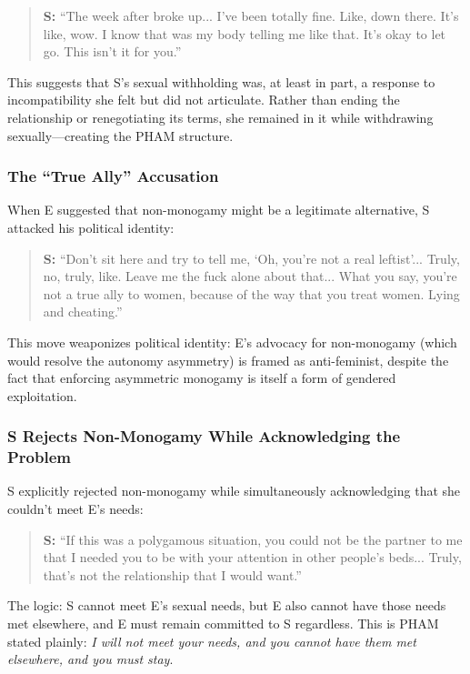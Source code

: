 \documentclass[12pt, letterpaper]{article}
\begin{document}
\begin{quote}
\textbf{S:} ``The week after broke up... I've been totally fine. Like, down there. It's like, wow. I know that was my body telling me like that. It's okay to let go. This isn't it for you.''
\end{quote}

This suggests that S's sexual withholding was, at least in part, a response to incompatibility she felt but did not articulate. Rather than ending the relationship or renegotiating its terms, she remained in it while withdrawing sexually---creating the PHAM structure.

\subsubsection{The ``True Ally'' Accusation}

When E suggested that non-monogamy might be a legitimate alternative, S attacked his political identity:

\begin{quote}
\textbf{S:} ``Don't sit here and try to tell me, `Oh, you're not a real leftist'... Truly, no, truly, like. Leave me the fuck alone about that... What you say, you're not a true ally to women, because of the way that you treat women. Lying and cheating.''
\end{quote}

This move weaponizes political identity: E's advocacy for non-monogamy (which would resolve the autonomy asymmetry) is framed as anti-feminist, despite the fact that enforcing asymmetric monogamy is itself a form of gendered exploitation.

\subsubsection{S Rejects Non-Monogamy While Acknowledging the Problem}

S explicitly rejected non-monogamy while simultaneously acknowledging that she couldn't meet E's needs:

\begin{quote}
\textbf{S:} ``If this was a polygamous situation, you could not be the partner to me that I needed you to be with your attention in other people's beds... Truly, that's not the relationship that I would want.''
\end{quote}

The logic: S cannot meet E's sexual needs, but E also cannot have those needs met elsewhere, and E must remain committed to S regardless. This is PHAM stated plainly: \textit{I will not meet your needs, and you cannot have them met elsewhere, and you must stay}.
\end{document}
